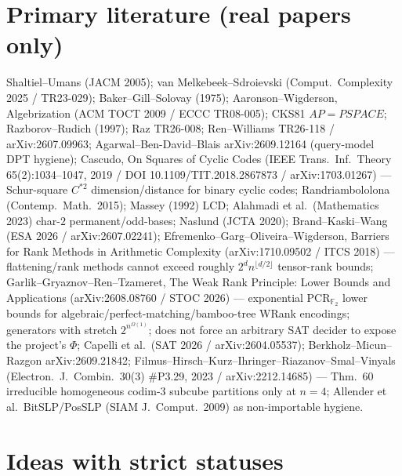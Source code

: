 \documentclass[11pt]{article}
\begin{document}
\section*{Primary literature (real papers only)}
Shaltiel--Umans (JACM 2005); van Melkebeek--Sdroievski (Comput.\ Complexity 2025 /
TR23-029); Baker--Gill--Solovay (1975); Aaronson--Wigderson, Algebrization
(ACM TOCT 2009 / ECCC TR08-005); CKS81 $AP=PSPACE$; Razborov--Rudich (1997);
Raz TR26-008; Ren--Williams TR26-118 / arXiv:2607.09963;
Agarwal--Ben-David--Blais arXiv:2609.12164 (query-model DPT hygiene);
Cascudo, On Squares of Cyclic Codes (IEEE Trans.\ Inf.\ Theory 65(2):1034--1047,
2019 / DOI 10.1109/TIT.2018.2867873 / arXiv:1703.01267) --- Schur-square
$C^{*2}$ dimension/distance for binary cyclic codes;
Randriambololona (Contemp.\ Math.\ 2015); Massey (1992) LCD;
Alahmadi et al.\ (Mathematics 2023) char-$2$ permanent/odd-bases;
Naslund (JCTA 2020); Brand--Kaski--Wang (ESA 2026 / arXiv:2607.02241);
Efremenko--Garg--Oliveira--Wigderson, Barriers for Rank Methods in Arithmetic
Complexity (arXiv:1710.09502 / ITCS 2018) --- flattening/rank methods cannot exceed
roughly $2^d n^{\lfloor d/2\rfloor}$ tensor-rank bounds;
Garlik--Gryaznov--Ren--Tzameret, The Weak Rank Principle: Lower Bounds and
Applications (arXiv:2608.08760 / STOC 2026) --- exponential PCR$_{\mathbb F_2}$
lower bounds for algebraic/perfect-matching/bamboo-tree WRank encodings; generators
with stretch $2^{n^{\Omega(1)}}$; does not force an arbitrary SAT decider to expose
the project's $\Phi$;
Capelli et al.\ (SAT 2026 / arXiv:2604.05537); Berkholz--Micun--Razgon
arXiv:2609.21842; Filmus--Hirsch--Kurz--Ihringer--Riazanov--Smal--Vinyals
(Electron.\ J.\ Combin.\ 30(3) \#P3.29, 2023 / arXiv:2212.14685) --- Thm.~60
irreducible homogeneous codim-3 subcube partitions only at $n=4$;
Allender et al.\ BitSLP/PosSLP (SIAM J.\ Comput.\ 2009) as non-importable hygiene.

\section*{Ideas with strict statuses}
\end{document}

